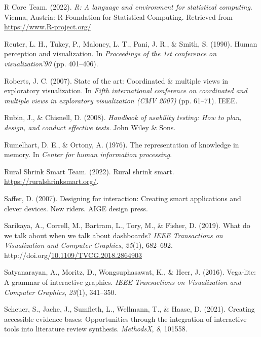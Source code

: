 \documentclass[print]{nuthesis}
\newlength{\cslhangindent}
\newenvironment{CSLReferences}[2]%
{\setlength{\parindent}{0pt}%
\everypar{\setlength{\hangindent}{\cslhangindent}}\ignorespaces}%
{\par}
\begin{document}
\begin{CSLReferences}{1}{0}
\leavevmode{}%
R Core Team. (2022). \emph{R: A language and environment for statistical computing}. Vienna, Austria: R Foundation for Statistical Computing. Retrieved from \url{https://www.R-project.org/}

\leavevmode{}%
Reuter, L. H., Tukey, P., Maloney, L. T., Pani, J. R., \& Smith, S. (1990). Human perception and visualization. In \emph{Proceedings of the 1st conference on visualization'90} (pp. 401--406).

\leavevmode{}%
Roberts, J. C. (2007). State of the art: Coordinated \& multiple views in exploratory visualization. In \emph{Fifth international conference on coordinated and multiple views in exploratory visualization (CMV 2007)} (pp. 61--71). IEEE.

\leavevmode{}%
Rubin, J., \& Chisnell, D. (2008). \emph{Handbook of usability testing: How to plan, design, and conduct effective tests}. John Wiley \& Sons.

\leavevmode{}%
Rumelhart, D. E., \& Ortony, A. (1976). The representation of knowledge in memory. In \emph{Center for human information processing}.

\leavevmode{}%
Rural Shrink Smart Team. (2022). Rural shrink smart. \url{https://ruralshrinksmart.org/}.

\leavevmode{}%
Saffer, D. (2007). Designing for interaction: Creating smart applications and clever devices. New riders. AIGE design press.

\leavevmode{}%
Sarikaya, A., Correll, M., Bartram, L., Tory, M., \& Fisher, D. (2019). What do we talk about when we talk about dashboards? \emph{IEEE Transactions on Visualization and Computer Graphics}, \emph{25}(1), 682--692. http://doi.org/\href{https://doi.org/10.1109/TVCG.2018.2864903}{10.1109/TVCG.2018.2864903}

\leavevmode{}%
Satyanarayan, A., Moritz, D., Wongsuphasawat, K., \& Heer, J. (2016). Vega-lite: A grammar of interactive graphics. \emph{IEEE Transactions on Visualization and Computer Graphics}, \emph{23}(1), 341--350.

\leavevmode{}%
Scheuer, S., Jache, J., Sumfleth, L., Wellmann, T., \& Haase, D. (2021). Creating accessible evidence bases: Opportunities through the integration of interactive tools into literature review synthesis. \emph{MethodsX}, \emph{8}, 101558.


\end{CSLReferences}
\end{document}
